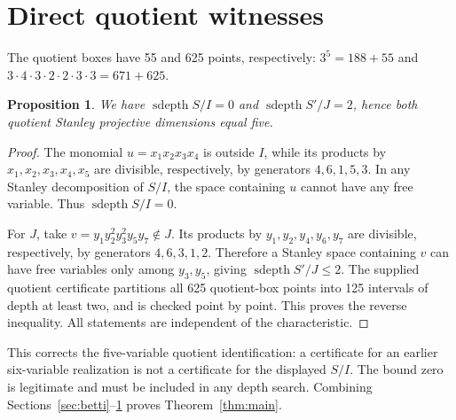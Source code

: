 \documentclass[11pt,a4paper]{article}
\newtheorem{proposition}[theorem]{Proposition}
\theoremstyle{remark}\newtheorem{remark}[theorem]{Remark}
\DeclareMathOperator{\sdepth}{sdepth}
\begin{document}
\section{Direct quotient witnesses}\label{sec:quotients}
The quotient boxes have 55 and 625 points, respectively: $3^5=188+55$ and $3\cdot4\cdot3\cdot2\cdot2\cdot3\cdot3=671+625$.
\begin{proposition}\label{prop:quotients}
We have $\sdepth S/I=0$ and $\sdepth S'/J=2$, hence both quotient Stanley projective dimensions equal five.
\end{proposition}
\begin{proof}
The monomial $u=x_1x_2x_3x_4$ is outside $I$, while its products by $x_1,x_2,x_3,x_4,x_5$ are divisible, respectively, by generators $4,6,1,5,3$. In any Stanley decomposition of $S/I$, the space containing $u$ cannot have any free variable. Thus $\sdepth S/I=0$.

For $J$, take $v=y_1y_2^2y_3^2y_5y_7\notin J$. Its products by $y_1,y_2,y_4,y_6,y_7$ are divisible, respectively, by generators $4,6,3,1,2$. Therefore a Stanley space containing $v$ can have free variables only among $y_3,y_5$, giving $\sdepth S'/J\le2$. The supplied quotient certificate partitions all 625 quotient-box points into 125 intervals of depth at least two, and is checked point by point. This proves the reverse inequality. All statements are independent of the characteristic.
\end{proof}
This corrects the five-variable quotient identification: a certificate for an earlier six-variable realization is not a certificate for the displayed $S/I$. The bound zero is legitimate and must be included in any depth search. Combining Sections~\ref{sec:betti}--\ref{sec:quotients} proves Theorem~\ref{thm:main}.
\end{document}
